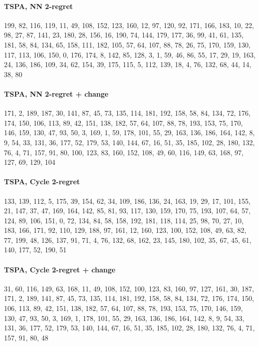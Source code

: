 \paragraph{TSPA, NN 2-regret}
{\footnotesize\ttfamily\raggedright 199, 82, 116, 119, 11, 49, 108, 152, 123, 160, 12, 97, 120, 92, 171, 166, 183, 10, 22, 98, 27, 87, 141, 23, 180, 28, 156, 16, 190, 74, 144, 179, 177, 36, 99, 41, 61, 135, 181, 58, 84, 134, 65, 158, 111, 182, 105, 57, 64, 107, 88, 78, 26, 75, 170, 159, 130, 117, 113, 106, 150, 0, 176, 174, 8, 142, 85, 128, 3, 1, 59, 46, 86, 55, 17, 29, 19, 163, 24, 136, 186, 109, 34, 62, 154, 39, 175, 115, 5, 112, 139, 18, 4, 76, 132, 68, 44, 14, 38, 80\par}

\paragraph{TSPA, NN 2-regret + change}
{\footnotesize\ttfamily\raggedright 171, 2, 189, 187, 30, 141, 87, 45, 73, 135, 114, 181, 192, 158, 58, 84, 134, 72, 176, 174, 150, 106, 113, 89, 42, 151, 138, 182, 57, 64, 107, 88, 78, 193, 153, 75, 170, 146, 159, 130, 47, 93, 50, 3, 169, 1, 59, 178, 101, 55, 29, 163, 136, 186, 164, 142, 8, 9, 54, 33, 131, 36, 177, 52, 179, 53, 140, 144, 67, 16, 51, 35, 185, 102, 28, 180, 132, 76, 4, 71, 157, 91, 80, 100, 123, 83, 160, 152, 108, 49, 60, 116, 149, 63, 168, 97, 127, 69, 129, 104\par}

\paragraph{TSPA, Cycle 2-regret}
{\footnotesize\ttfamily\raggedright 133, 139, 112, 5, 175, 39, 154, 62, 34, 109, 186, 136, 24, 163, 19, 29, 17, 101, 155, 21, 147, 37, 47, 169, 164, 142, 85, 81, 93, 117, 130, 159, 170, 75, 193, 107, 64, 57, 124, 89, 106, 151, 0, 72, 134, 84, 58, 158, 192, 181, 118, 114, 25, 98, 70, 27, 10, 183, 166, 171, 92, 110, 129, 188, 97, 161, 12, 160, 123, 100, 152, 108, 49, 63, 82, 77, 199, 48, 126, 137, 91, 71, 4, 76, 132, 68, 162, 23, 145, 180, 102, 35, 67, 45, 61, 140, 177, 52, 190, 51\par}

\paragraph{TSPA, Cycle 2-regret + change}
{\footnotesize\ttfamily\raggedright 31, 60, 116, 149, 63, 168, 11, 49, 108, 152, 100, 123, 83, 160, 97, 127, 161, 30, 187, 171, 2, 189, 141, 87, 45, 73, 135, 114, 181, 192, 158, 58, 84, 134, 72, 176, 174, 150, 106, 113, 89, 42, 151, 138, 182, 57, 64, 107, 88, 78, 193, 153, 75, 170, 146, 159, 130, 47, 93, 50, 3, 169, 1, 178, 101, 55, 29, 163, 136, 186, 164, 142, 8, 9, 54, 33, 131, 36, 177, 52, 179, 53, 140, 144, 67, 16, 51, 35, 185, 102, 28, 180, 132, 76, 4, 71, 157, 91, 80, 48\par}

